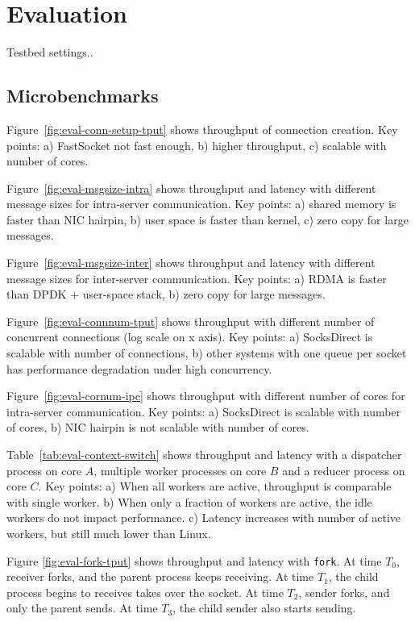 \section{Evaluation}
\label{sec:evaluation}

Testbed settings..

\subsection{Microbenchmarks}

Figure~\ref{fig:eval-conn-setup-tput} shows throughput of connection creation. Key points: a) FastSocket not fast enough, b) higher throughput, c) scalable with number of cores.

Figure~\ref{fig:eval-msgsize-intra} shows throughput and latency with different message sizes for intra-server communication. Key points: a) shared memory is faster than NIC hairpin, b) user space is faster than kernel, c) zero copy for large messages.

Figure~\ref{fig:eval-msgsize-inter} shows throughput and latency with different message sizes for inter-server communication. Key points: a) RDMA is faster than DPDK + user-space stack, b) zero copy for large messages.

Figure~\ref{fig:eval-connnum-tput} shows throughput with different number of concurrent connections (log scale on x axis). Key points: a) SocksDirect is scalable with number of connections, b) other systems with one queue per socket has performance degradation under high concurrency.

Figure~\ref{fig:eval-cornum-ipc} shows throughput with different number of cores for intra-server communication. Key points: a) SocksDirect is scalable with number of cores, b) NIC hairpin is not scalable with number of cores.

Table~\ref{tab:eval-context-switch} shows throughput and latency with a dispatcher process on core $A$, multiple worker processes on core $B$ and a reducer process on core $C$. Key points: a) When all workers are active, throughput is comparable with single worker. b) When only a fraction of workers are active, the idle workers do not impact performance. c) Latency increases with number of active workers, but still much lower than Linux.

Figure \ref{fig:eval-fork-tput} shows throughput and latency with \texttt{fork}. At time $T_0$, receiver forks, and the parent process keeps receiving. At time $T_1$, the child process begins to receives takes over the socket. At time $T_2$, sender forks, and only the parent sends. At time $T_3$, the child sender also starts sending.

